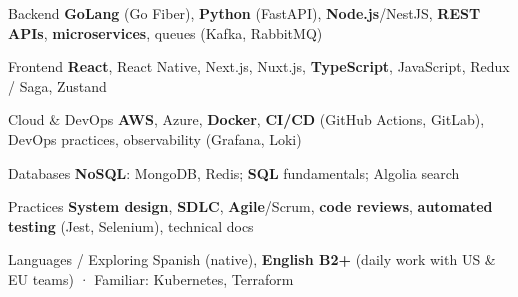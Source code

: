 
\begin{cvskills}

  \cvskill
  {Backend}
  {\textbf{GoLang} (Go Fiber), \textbf{Python} (FastAPI), \textbf{Node.js}/NestJS, \textbf{REST APIs}, \textbf{microservices}, queues (Kafka, RabbitMQ)}

  \cvskill
  {Frontend}
  {\textbf{React}, React Native, Next.js, Nuxt.js, \textbf{TypeScript}, JavaScript, Redux / Saga, Zustand}

  \cvskill
  {Cloud \& DevOps}
  {\textbf{AWS}, Azure, \textbf{Docker}, \textbf{CI/CD} (GitHub Actions, GitLab), DevOps practices, observability (Grafana, Loki)}

  \cvskill
  {Databases}
  {\textbf{NoSQL}: MongoDB, Redis; \textbf{SQL} fundamentals; Algolia search}

  \cvskill
  {Practices}
  {\textbf{System design}, \textbf{SDLC}, \textbf{Agile}/Scrum, \textbf{code reviews}, \textbf{automated testing} (Jest, Selenium), technical docs}

  \cvskill
  {Languages / Exploring}
  {Spanish (native), \textbf{English B2+} (daily work with US \& EU teams) · Familiar: Kubernetes, Terraform}

\end{cvskills}
